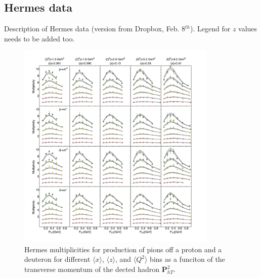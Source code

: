 \documentclass[aps,preprintnumbers,showpacs,nofootinbib,superscriptaddress,floatfix]{revtex4}
\begin{document}
\subsection{Hermes data}
\label{ss:hermes}

Description of Hermes data (version from Dropbox, Feb. 8$^{th}$).
Legend for $z$ values needs to be added too.
\begin{figure}[h!]
\begin{center}
\includegraphics[width=0.85\textwidth]{plots/Hermes/Hermes_Pions_SCIplot_flINDEP.pdf}
\end{center}
\caption{Hermes multiplicities for production of pions off a proton and a deuteron for different $\langle x \rangle$, $\langle z \rangle$, and $\langle Q^2 \rangle$ bins as a funciton of the transverse momentum of the dected hadron ${\bm P}_{hT}^ 2$.} 
\label{f:H_pions}
\end{figure}
\end{document}
